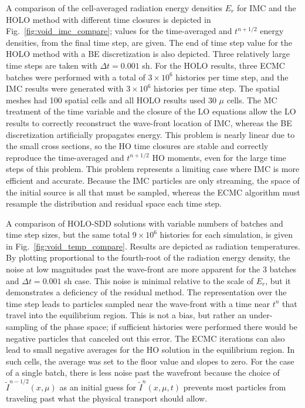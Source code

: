\documentclass{anstrans}
\begin{document}
A comparison of the cell-averaged radiation energy densities $E_r$ for IMC and the HOLO
method with different time closures is depicted in Fig.~\ref{fig:void_imc_compare};
values for the time-averaged and $t^{n+1/2}$ energy densities, from the final time
step, are given.  The end of time step value for the HOLO method with a BE discretization is also depicted.
Three relatively large time steps are taken with $\Delta t = 0.001$ sh.
For the HOLO results, three ECMC batches were performed with
a total of $3\times10^6$ histories per time step, and the IMC results were generated with
$3\times10^6$ histories per time step.
The spatial meshes had 100 spatial cells and all HOLO results used 30 $\mu$ cells.  
The MC treatment of the time
variable and the closure of the LO equations allow the LO results to correctly reconstruct
the wave-front location of IMC, whereas the BE discretization artificially propagates
energy. This problem is nearly linear due to the small cross sections, so the HO time closures are
stable and correctly reproduce the time-averaged and $t^{n+1/2}$ HO moments, even for the large time steps of this problem.
This problem represents a limiting case where IMC is more efficient and accurate.  Because the IMC particles are only 
streaming, the space of the initial source is all that must be sampled, whereas the ECMC algorithm must resample
the distribution and residual space each time step.

A comparison of HOLO-SDD solutions with variable numbers of batches and time step sizes, but the
same total $9\times10^6$ histories for each simulation, is given in Fig.~\ref{fig:void_temp_compare}.  Results are 
depicted as radiation temperatures.  By plotting
proportional to the fourth-root of the radiation energy density, the noise at low
magnitudes past the wave-front are more apparent for the 3 batches and $\Delta t = 0.001$ sh
case.  This noise is minimal relative to the scale of $E_r$, but it demonstrates a
deficiency of the residual method.  The representation over
the time step leads to particles sampled near the wave-front with a time near
$t^{n}$ that travel into the equilibrium region.  This is not a
bias, but rather an under-sampling of the phase space; if sufficient histories were performed there
would be negative particles that canceled out this error. The ECMC iterations can also lead to small negative
averages for the HO solution in the equilibrium region.   In such cells, the
average was set to the floor value and slopes to zero. For the case of a single batch, 
there is less noise past the wavefront because the
choice of $\tilde I^{n-1/2}(x,\mu)$ as an initial guess for $\tilde I^{n}(x,\mu,t)$ prevents most particles from
traveling past what the physical transport should allow.
\end{document}
